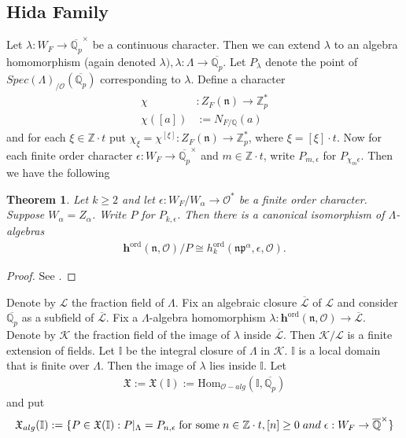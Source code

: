 \documentclass[reqno,10pt]{amsart}
\newcommand{\zp}{\mathbb{Z}_{p}}
\newcommand{\qp}{\mathbb{Q}_{p}}
\newcommand{\q}{\mathbb{Q}}
\newcommand{\z}{\mathbb{Z}}
\newcommand{\h}{\mathbf{h}}
\newcommand{\I}{\mathbb{I}}
\newcommand{\mcL}{\mathcal{L}}
\newcommand{\mcO}{\mathcal{O}}
\newcommand{\mck}{\mathcal{K}}
\newcommand{\p}{\mathfrak{p}}
\newcommand{\n}{\mathfrak{n}}
\theoremstyle{plain}
\newtheorem{thm}{Theorem}[section]
\theoremstyle{definition}
\begin{document}
\subsection{Hida Family} \label{Hida family}
Let $\lambda : W_F \rightarrow \overline{\qp}^\times$ be a continuous character. Then we can extend $\lambda$ to an algebra homomorphism (again denoted $\lambda), \lambda : \Lambda \rightarrow \overline{\qp}$. Let $P_\lambda$ denote the point of $Spec(\Lambda)_{/\mathcal{O}}(\overline{\qp})$ corresponding to $\lambda$. Define a character 
\begin{align*}
    \chi & : Z_F(\n) \rightarrow \zp^* \\
    \chi([a]) & := N_{F/\q}(a)
\end{align*}
and for each $\xi \in \z \cdot t$ put $\chi_\xi = \chi^{[\xi]} : Z_F(\n) \rightarrow \zp^*$, where $\xi = [\xi] \cdot t$. Now for each finite order character $\epsilon : W_F \rightarrow \overline{\qp}^\times$ and $m \in \z \cdot t$, write $P_{m,\epsilon}$ for $P_{\chi_m\epsilon}$. Then we have the following 
\begin{thm}
    Let $k \geq 2$ and let $\epsilon : W_F/W_\alpha \rightarrow \mathcal{O}^*$ be a finite order character. Suppose $W_\alpha = Z_\alpha$. Write $P$ for $P_{k,\epsilon}$. Then there is a canonical isomorphism of $\Lambda$-algebras
    \begin{align*}
        \h^{\mathrm{ord}}(\n,\mathcal{O})/P \cong h_{k}^{\mathrm{ord}}(\n\p^\alpha,\epsilon,\mathcal{O}).
    \end{align*}
\end{thm} 
\begin{proof}
    See \cite[Corollary 4.21]{HidaBook}.
\end{proof}
Denote by $\mcL$ the fraction field of $\Lambda$. Fix an algebraic closure $\overline{\mcL}$ of $\mcL$ and consider $\overline{\qp}$ as a subfield of $\overline{\mcL}$. Fix a $\Lambda$-algebra homomorphism $\lambda : \h^{\mathrm{ord}}(\n,\mcO) \rightarrow \overline{\mcL}$. Denote by $\mck$ the fraction field of the image of $\lambda$ inside $\overline{\mcL}$. Then $\mck/\mcL$ is a finite extension of fields. Let $\I$ be the integral closure of $\Lambda$ in $\mck$. $\I$ is a local domain that is finite over $\Lambda$. Then the image of $\lambda$ lies inside $\I$. Let 
\begin{align*}
    \mathfrak{X} := \mathfrak{X}(\I) := \mathrm{Hom}_{\mathcal{O}-alg}(\I,\overline{\qp})
\end{align*}
and put 
\begin{align*}
    \mathfrak{X}_{alg}(\I) := \{ P \in \mathfrak{X}(\I) : P|_\Lambda = P_{n,\epsilon} \hspace{1mm} \text{for some} \hspace{1mm} n \in \z \cdot t, [n] \geq 0 \hspace{1mm} and \hspace{1mm} \epsilon : W_F \rightarrow \overline{\q}^\times \}
\end{align*}
\end{document}
